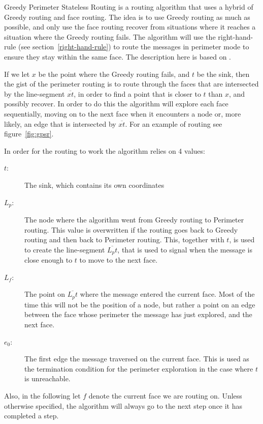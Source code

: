 \label{section:gpsr}
Greedy Perimeter Stateless Routing is a routing algorithm that uses a hybrid of Greedy routing and face routing. The idea is to use Greedy routing as much as possible, and only use the face routing recover from situations where it reaches a situation where the Greedy routing fails. The algorithm will use the right-hand-rule (see section~\ref{right-hand-rule}) to route the messages in perimeter mode to ensure they stay within the same face. The description here is based on \cite{gpsr}.

If we let $x$ be the point where the Greedy routing fails, and $t$ be the sink, then the gist of the perimeter routing is to route through the faces that are intersected by the line-segment $\overline{xt}$, in order to find a point that is closer to $t$ than $x$, and possibly recover. In order to do this the algorithm will explore each face sequentially, moving on to the next face when it encounters a node or, more likely, an edge that is intersected by $\overline{xt}$. For an example of routing see figure~\ref{fig:gpsr}. 

In order for the routing to work the algorithm relies on 4 values:
\begin{description}
\item[$t$:] The sink, which contains its own coordinates
\item[$L_p$:] The node where the algorithm went from Greedy routing to Perimeter routing. This value is overwritten if the routing goes back to Greedy routing and then back to Perimeter routing. This, together with $t$, is used to create the line-segment $\overline{L_pt}$, that is used to signal when the message is close enough to $t$ to move to the next face.
\item[$L_f$:] The point on $\overline{L_pt}$ where the message entered the current face. Most of the time this will not be the position of a node, but rather a point on an edge between the face whose perimeter the message has just explored, and the next face. 
\item[$e_0$:] The first edge the message traversed on the current face. This is used as the termination condition for the perimeter exploration in the case where $t$ is unreachable. 
\end{description}

Also, in the following let $f$ denote the current face we are routing on. Unless otherwise specified, the algorithm will always go to the next step once it has completed a step.


